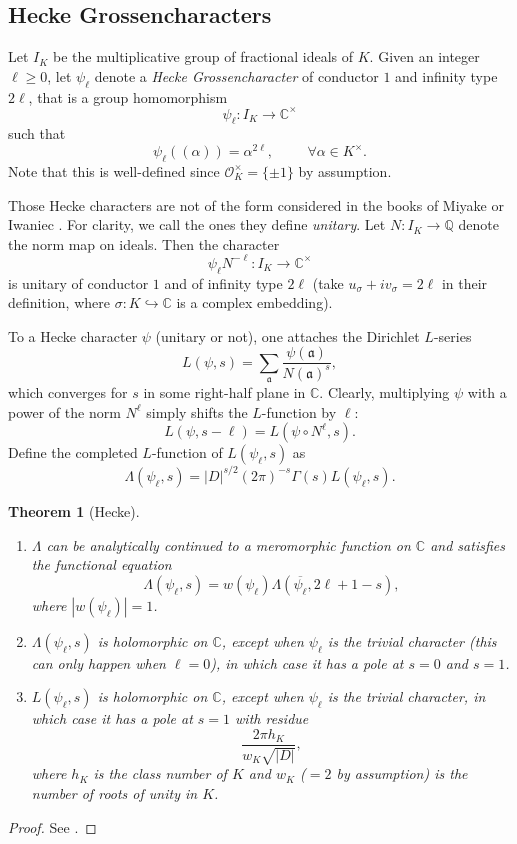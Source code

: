 \documentclass[twoside,10pt]{article}
\newtheorem{theorem}{Theorem}
\newcommand{\Q}{\mathbb{Q}}
\newcommand{\C}{\mathbb{C}}
\newcommand{\rarr}{\rightarrow}
\newcommand{\esp}{\hspace{1cm}}
\newcommand{\ida}{\mathfrak{a}}
\renewcommand{\O}{\mathcal{O}}
\newcommand{\runi}{w_K}
\begin{document}
\subsection{Hecke Grossencharacters}
Let $I_K$ be the multiplicative group of fractional ideals of $K$. Given an integer $\ell\geq 0$, let $\psi_\ell$ denote a \emph{Hecke Grossencharacter} of conductor $1$ and infinity type $2\ell$, that is a group homomorphism
\[\psi_\ell:I_K\rarr \C^\times\]
such that
\[\psi_\ell((\alpha))=\alpha^{2\ell},\esp\forall \alpha\in K^\times.\]
Note that this is well-defined since $\O_K^\times = \{\pm1\}$ by assumption.

Those Hecke characters are not of the form considered in the books of Miyake \cite[Ch. 3, Sec. 3]{Miya} or Iwaniec \cite[Ch. 12, Sec. 2]{Iwan}. For clarity, we call the ones they define \emph{unitary}. Let $N:I_K\rarr \Q$ denote the norm map on ideals. Then the character
\[\psi_\ell N^{-\ell}:I_K\rarr \C^\times\]
is unitary of conductor $1$ and of infinity type $2\ell$ (take $u_\sigma+iv_\sigma=2\ell$ in their definition, where $\sigma:K\hookrightarrow\C$ is a complex embedding). 

To a Hecke character $\psi$ (unitary or not), one attaches the Dirichlet $L$-series
\[L(\psi,s) = \sum_\ida \frac{\psi(\ida)}{N(\ida)^s},\]
which converges for $s$ in some right-half plane in $\C$. Clearly, multiplying $\psi$ with a power of the norm $N^\ell$ simply shifts the $L$-function by $\ell$:
\[L(\psi,s-\ell)=L(\psi\circ N^\ell,s).\]
Define the completed $L$-function of $L(\psi_\ell,s)$ as
\[\Lambda(\psi_\ell,s)=|D|^{s/2}(2\pi)^{-s}\Gamma(s)L(\psi_\ell,s).\]

\begin{theorem}[Hecke]
\begin{enumerate}
	\item $\Lambda$ can be analytically continued to a meromorphic function on $\C$ and satisfies the functional equation
\[\Lambda(\psi_\ell,s)=w(\psi_\ell)\Lambda(\overline{\psi_\ell},2\ell+1-s),\]
where $|w(\psi_\ell)|=1$.%
	\item $\Lambda(\psi_\ell,s)$ is holomorphic on $\C$, except when $\psi_\ell$ is the trivial character (this can only happen when $\ell = 0$), in which case it has a pole at $s=0$ and $s=1$.
	\item $L(\psi_\ell,s)$ is holomorphic on $\C$, except when $\psi_\ell$ is the trivial character, in which case it has a pole at $s=1$ with residue
	\[\frac{2\pi h_K}{\runi \sqrt{|D|}},\]
	where $h_K$ is the class number of $K$ and $\runi$ ($=2$ by assumption) is the number of roots of unity in $K$.
\end{enumerate}
\end{theorem}
\begin{proof}
	See \cite[Ch. 3, Sec. 3]{Miya}.
\end{proof}
\end{document}
